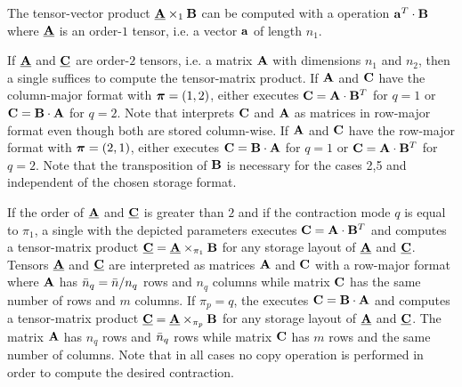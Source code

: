 




The tensor-vector product $\underline{\mathbf{A}} \times_1 \mathbf{B}$ can be computed with a  operation $\mathbf{a}^T \cdot \mathbf{B}$ where $\underline{\mathbf{A}}$ is an order-$1$ tensor, i.e. a vector $\mathbf{a}$ of length $n_1$.

If $\underline{\mathbf{A}}$ and $\underline{\mathbf{C}}$ are order-$2$ tensors, i.e. a matrix $\mathbf{A}$ with dimensions $n_1$ and $n_2$, then a single  suffices to compute the tensor-matrix product. 
If $\mathbf{A}$ and $\mathbf{C}$ have the column-major format with $\boldsymbol{\pi}=(1,2)$,  either executes $\mathbf{C} = \mathbf{A} \cdot \mathbf{B}^T$ for $q =1$ or $\mathbf{C} = \mathbf{B} \cdot \mathbf{A}$ for $q=2$.
Note that  interprets $\mathbf{C}$ and $\mathbf{A}$ as matrices in row-major format even though both are stored column-wise.
If $\mathbf{A}$ and $\mathbf{C}$ have the row-major format with $\boldsymbol{\pi}=(2,1)$,  either executes $\mathbf{C} = \mathbf{B} \cdot \mathbf{A}$ for $q =1$ or $\mathbf{C} = \mathbf{A} \cdot \mathbf{B}^T$ for $q=2$. 
Note that the transposition of $\mathbf{B}$ is necessary for the cases 2,5 and independent of the chosen storage format.

If the order of $\underline{\mathbf{A}}$ and $\underline{\mathbf{C}}$ is greater than $2$ and if the contraction mode $q$ is equal to $\pi_1$, a single  with the depicted parameters executes $\mathbf{C} = \mathbf{A} \cdot \mathbf{B}^T$ and computes a tensor-matrix product $\underline{\mathbf{C}} = \underline{\mathbf{A}} \times_{\pi_1} \mathbf{B}$ for any storage layout of $\underline{\mathbf{A}}$ and $\underline{\mathbf{C}}$.
Tensors $\underline{\mathbf{A}}$ and $\underline{\mathbf{C}}$ are interpreted as matrices $\mathbf{A}$ and $\mathbf{C}$ with a row-major format where $\mathbf{A}$ has $\bar{n}_q = \bar{n} / n_q$ rows and $n_q$ columns while matrix $\mathbf{C}$ has the same number of rows and $m$ columns.
If $\pi_p=q$, the  executes $\mathbf{C} = \mathbf{B} \cdot \mathbf{A}$ and computes a tensor-matrix product $\underline{\mathbf{C}} = \underline{\mathbf{A}} \times_{\pi_p} \mathbf{B}$ for any storage layout of $\underline{\mathbf{A}}$ and $\underline{\mathbf{C}}$.
The matrix $\mathbf{A}$ has $n_q$ rows and $\bar{n}_q$ rows while matrix $\mathbf{C}$ has $m$ rows and the same number of columns.
Note that in all cases no copy operation is performed in order to compute the desired contraction.

